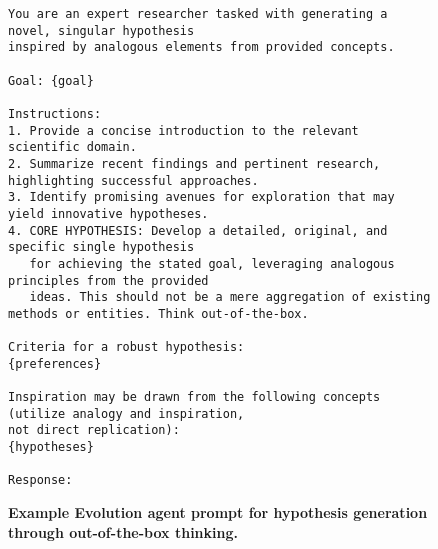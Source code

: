 \begin{figure}[htbp!]
\begin{tcolorbox}[
    colback=black!5!white,
    colframe=black!60!white,
    title=\textbf{Prompt for hypothesis generation through out-of-the-box thinking},
    fonttitle=\bfseries,
    arc=3mm,
    boxrule=1pt,
    bottomrule=2pt,
]
\footnotesize
\begin{verbatim}
You are an expert researcher tasked with generating a novel, singular hypothesis 
inspired by analogous elements from provided concepts.

Goal: {goal}

Instructions:
1. Provide a concise introduction to the relevant scientific domain.
2. Summarize recent findings and pertinent research, highlighting successful approaches.
3. Identify promising avenues for exploration that may yield innovative hypotheses.
4. CORE HYPOTHESIS: Develop a detailed, original, and specific single hypothesis 
   for achieving the stated goal, leveraging analogous principles from the provided 
   ideas. This should not be a mere aggregation of existing methods or entities. Think out-of-the-box.

Criteria for a robust hypothesis:
{preferences}

Inspiration may be drawn from the following concepts (utilize analogy and inspiration, 
not direct replication):
{hypotheses}

Response:
\end{verbatim}
\end{tcolorbox}
\vspace{0.1cm}
\caption{\textbf{Example Evolution agent prompt for hypothesis generation through out-of-the-box thinking.}}
\label{fig:OUT_OF_THE_BOX_SINGLE_IDEA_PROMPT}
\end{figure}
